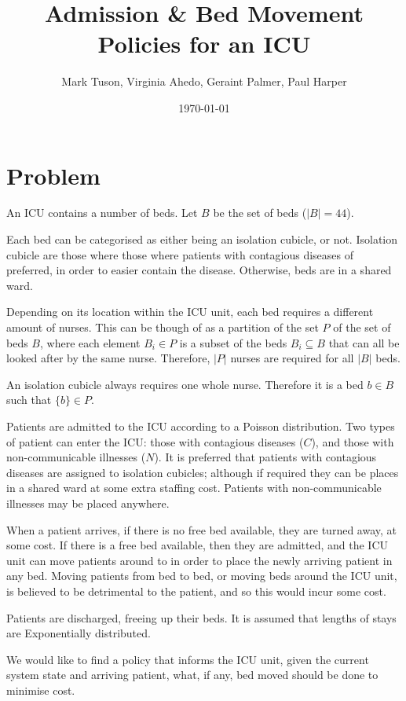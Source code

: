 \documentclass{article}
\title{Admission \& Bed Movement Policies for an ICU}
\author{Mark Tuson, Virginia Ahedo, Geraint Palmer, Paul Harper}
\date{\today}
\begin{document}
\maketitle

\section{Problem}
An ICU contains a number of beds. Let $B$ be the set of beds ($|B| = 44$).

Each bed can be categorised as either being an isolation cubicle, or not.
Isolation cubicle are those where those where patients with contagious diseases of preferred, in order to easier contain the disease.
Otherwise, beds are in a shared ward.

Depending on its location within the ICU unit, each bed requires a different amount of nurses.
This can be though of as a partition of the set $P$ of the set of beds $B$, where each element $B_i \in P$ is a subset of the beds $B_i \subseteq B$ that can all be looked after by the same nurse.
Therefore, $|P|$ nurses are required for all $|B|$ beds.

An isolation cubicle always requires one whole nurse.
Therefore it is a bed $b \in B$ such that $\{b\} \in P$.

Patients are admitted to the ICU according to a Poisson distribution.
Two types of patient can enter the ICU: those with contagious diseases ($C$), and those with non-communicable illnesses ($N$).
It is preferred that patients with contagious diseases are assigned to isolation cubicles; although if required they can be places in a shared ward at some extra staffing cost. Patients with non-communicable illnesses may be placed anywhere.

When a patient arrives, if there is no free bed available, they are turned away, at some cost.
If there is a free bed available, then they are admitted, and the ICU unit can move patients around to in order to place the newly arriving patient in any bed.
Moving patients from bed to bed, or moving beds around the ICU unit, is believed to be detrimental to the patient, and so this would incur some cost.

Patients are discharged, freeing up their beds.
It is assumed that lengths of stays are Exponentially distributed.

We would like to find a policy that informs the ICU unit, given the current system state and arriving patient, what, if any, bed moved should be done to minimise cost.
\end{document}
